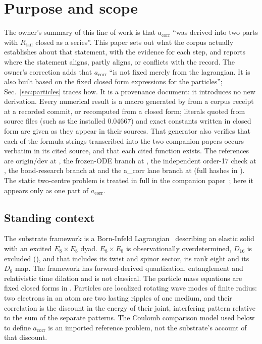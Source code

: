 \documentclass[aps,prd,onecolumn,amsmath,amssymb,longbibliography,floatfix,nofootinbib]{revtex4-2}
\newcommand{\acorr}{a_{\mathrm{corr}}}
\begin{document}
\maketitle

\section{Purpose and scope}
The owner's summary of this line of work is that $\acorr$ ``was derived into two parts with $R_{\mathrm{tail}}$ closed as a series''. This paper sets out what the corpus actually establishes about that statement, with the evidence for each step, and reports where the statement aligns, partly aligns, or conflicts with the record. The owner's correction adds that $\acorr$ ``is not fixed merely from the lagrangian. It is also built based on the fixed closed form expressions for the particles''; Sec.~\ref{sec:particles} traces how. It is a provenance document: it introduces no new derivation. Every numerical result is a macro generated by  from a corpus receipt at a recorded commit, or recomputed from a closed form; literals quoted from source files (such as the installed $0.04667$) and exact constants written in closed form are given as they appear in their sources. That generator also verifies that each of the \TranscriptionCountVal{} formula strings transcribed into the two companion papers occurs verbatim in its cited source, and that each cited function exists. The references are origin/dev at \RefDev, the frozen-ODE branch at \RefOde, the independent order-17 check at \RefCTwoSeven, the bond-research branch at \RefBond{} and the a\_corr lane branch at \RefAcorrTwoEight{} (full hashes in ). The static two-centre problem is treated in full in the companion paper~\cite{TwoCenterPaper}; here it appears only as one part of $\acorr$.

\subsection{Standing context}
The substrate framework is a Born-Infeld Lagrangian~\cite{BornInfeld1934} describing an elastic solid with an excited $E_8\times E_8$ dyad. $E_8\times E_8$ is observationally overdetermined, $D_{16}$ is excluded (), and that includes its twist and spinor sector, its rank eight and its $D_8$ map. The framework has forward-derived quantization, entanglement and relativistic time dilation and is not classical. The particle mass equations are fixed closed forms in . Particles are localized rotating wave modes of finite radius: two electrons in an atom are two lasting ripples of one medium, and their correlation is the discount in the energy of their joint, interfering pattern relative to the sum of the separate patterns. The Coulomb comparison model used below to define $\acorr$ is an imported reference problem, not the substrate's account of that discount.
\end{document}
